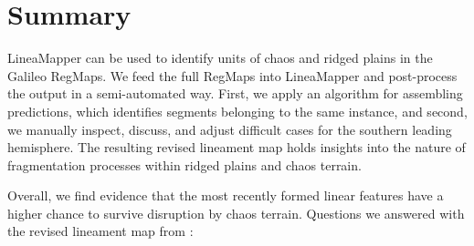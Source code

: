 \section{Summary}\label{sec:Summary}

LineaMapper can be used to identify units of chaos and ridged plains in the Galileo RegMaps. 
We feed the full RegMaps into LineaMapper and post-process the output in a semi-automated way. First, we apply an algorithm for assembling predictions, which identifies segments belonging to the same instance, and second, we manually inspect, discuss, and adjust difficult cases for the southern leading hemisphere. The resulting revised lineament map holds insights into the nature of fragmentation processes within ridged plains and chaos terrain.


Overall, we find evidence that the most recently formed linear features have a higher chance to survive disruption by chaos terrain. Questions we answered with the revised lineament map from :
